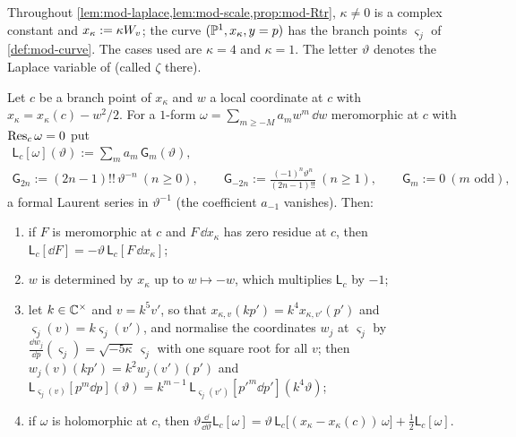 Throughout \cref{lem:mod-laplace,lem:mod-scale,prop:mod-Rtr}, $\kappa\neq 0$ is a complex constant and $x_\kappa:=\kappa W_{v}$; the curve $(\mathbb{P}^1,x_\kappa,y=p)$ has the branch points $\varsigma_j$ of \cref{def:mod-curve}. The cases used are $\kappa=4$ and $\kappa=1$. The letter $\vartheta$ denotes the Laplace variable of \cite[(2-31), (2-32)]{Dunin-Barkowski:2015caa} (called $\zeta$ there).

\begin{lem}
\label{lem:mod-laplace}
Let $c$ be a branch point of $x_\kappa$ and $w$ a local coordinate at $c$ with $x_\kappa=x_\kappa(c)-w^2/2$. For a $1$-form $\omega=\sum_{m\geq -M}a_mw^m\,\dd w$ meromorphic at $c$ with $\operatorname*{Res}_c\omega=0$ put
\begin{equation}
\label{eq:mod-laplace}
\begin{gathered}
\mathsf L_c[\omega](\vartheta):=\sum_ma_m\,\mathsf G_m(\vartheta),\\
\mathsf G_{2n}:=(2n-1)!!\,\vartheta^{-n}\ (n\geq 0),\qquad \mathsf G_{-2n}:=\frac{(-1)^n\vartheta^n}{(2n-1)!!}\ (n\geq 1),\qquad \mathsf G_m:=0\ (m\text{ odd}),
\end{gathered}
\end{equation}
a formal Laurent series in $\vartheta^{-1}$ (the coefficient $a_{-1}$ vanishes). Then:
\begin{enumerate}
\item if $F$ is meromorphic at $c$ and $F\,\dd x_\kappa$ has zero residue at $c$, then $\mathsf L_c[\dd F]=-\vartheta\,\mathsf L_c[F\,\dd x_\kappa]$;
\item $w$ is determined by $x_\kappa$ up to $w\mapsto -w$, which multiplies $\mathsf L_c$ by $-1$;
\item let $k\in\mathbb{C}^\times$ and $v=k^5v'$, so that $x_{\kappa,v}(kp')=k^4x_{\kappa,v'}(p')$ and $\varsigma_j(v)=k\varsigma_j(v')$, and normalise the coordinates $w_j$ at $\varsigma_j$ by $\frac{\dd w_j}{\dd p}(\varsigma_j)=\sqrt{-5\kappa}\,\varsigma_j$ with one square root for all $v$; then $w_j(v)(kp')=k^2w_j(v')(p')$ and $\mathsf L_{\varsigma_j(v)}[p^m\dd p](\vartheta)=k^{m-1}\,\mathsf L_{\varsigma_j(v')}[p'^m\dd p'](k^4\vartheta)$;
\item if $\omega$ is holomorphic at $c$, then $\vartheta\frac{\dd}{\dd\vartheta}\mathsf L_c[\omega]=\vartheta\,\mathsf L_c\big[(x_\kappa-x_\kappa(c))\,\omega\big]+\frac12\mathsf L_c[\omega]$.
\end{enumerate}
\end{lem}

